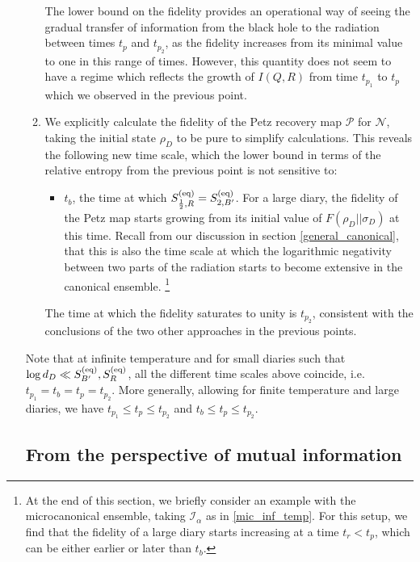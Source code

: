\documentclass[a4paper,11pt]{article}
\newcommand\half{{\ensuremath{\frac{1}{2}}}}
\newcommand\al{{\alpha}}
\newcommand\ha{{\half}}
\newcommand\sI{{\ensuremath{{\mathcal I}}}}
\newcommand\sN{{\ensuremath{{\mathcal N}}}}
\newcommand\sP{{\ensuremath{{\mathcal P}}}}
\begin{document}
\begin{enumerate}
\begin{enumerate}
The lower bound on the fidelity provides an operational way of seeing the gradual transfer of information from the black hole to the radiation between times $t_p$ and $t_{p_2}$, as the fidelity increases from its minimal value to one in this range of times. However, this quantity does not seem to have a regime which reflects the growth of $I(Q, R)$ from time $t_{p_1}$ to $t_p$ which we observed in the previous point. 
\item We explicitly calculate the fidelity of the Petz recovery map $\sP$ for $\sN$, taking the initial state $\rho_D$ to be pure to simplify calculations. This reveals the following new time scale, which the lower bound in terms of the relative entropy from the previous point is not sensitive to: 
\begin{itemize} 
\item $t_b$, the time at which $S^{\rm (eq)}_{\ha, R} = S^{\rm (eq)}_{2, B'}$. For a large diary, the fidelity of the Petz map starts growing from its initial value of $F(\rho_D||\sigma_D)$ at this time. Recall from our discussion in section \ref{general_canonical}, that this is also the time scale at which the logarithmic negativity between two parts of the radiation starts to become extensive in the canonical ensemble. \footnote{At the end of this section, we briefly consider an example with the microcanonical ensemble, taking $\sI_{\al}$ as in \eqref{mic_inf_temp}. For this setup, we find that the fidelity of a large diary starts increasing at a time $t_r<t_p$, which can be either earlier or later than $t_b$.}
\end{itemize} 
The time at which the fidelity saturates to unity is $t_{p_2}$, consistent with the conclusions of the two other approaches in the previous points.
\end{enumerate} 
Note that at infinite temperature and for small diaries such that $\log d_D \ll S^{\rm (eq)}_{B'}, S^{\rm (eq)}_R$, all the different time scales above coincide, i.e.~$t_{p_1} = t_b = t_p = t_{p_2}$. More generally, allowing for finite temperature and large diaries, we have $t_{p_1} \leq t_p \leq t_{p_2}$ and $t_{b} \leq t_p \leq t_{p_2}$. 








\subsection{%
From the perspective of 
mutual information} 
\label{mutual_ref}


\end{enumerate}
\end{document}
